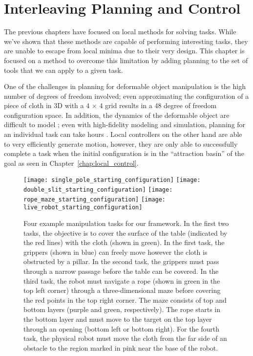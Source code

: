 \chapter{Interleaving Planning and Control}
\label{chap:interleaving}

The previous chapters have focused on local methods for solving tasks. While we've shown that these methods are capable of performing interesting tasks, they are unable to escape from local minima due to their very design. This chapter is focused on a method to overcome this limitation by adding planning to the set of tools that we can apply to a given task.

One of the challenges in planning for deformable object manipulation is the high number of degrees of freedom involved; even approximating the configuration of a piece of cloth in 3D with a 4 $\times$ 4 grid results in a 48 degree of freedom configuration space. In addition, the dynamics of the deformable object are difficult to model \citep{Essahbi2012}; even with high-fidelity modeling and simulation, planning for an individual task can take hours \citep{Bai2016}. Local controllers on the other hand are able to very efficiently generate motion, however, they are only able to successfully complete a task when the initial configuration is in the ``attraction basin'' of the goal as seen in Chapter~\ref{chap:local_control}.

\begin{figure*}[t]
    \centering
    \texttt{[image: single\_pole\_starting\_configuration]}
    \hfill
    \texttt{[image: double\_slit\_starting\_configuration]}
    \hfill
    \texttt{[image: rope\_maze\_starting\_configuration]}
    \hfill
    \texttt{[image: live\_robot\_starting\_configuration]}
    \caption{Four example manipulation tasks for our framework. In the first two tasks, the objective is to cover the surface of the table (indicated by the red lines) with the cloth (shown in green). In the first task, the grippers (shown in blue) can freely move however the cloth is obstructed by a pillar. In the second task, the grippers must pass through a narrow passage before the table can be covered. In the third task, the robot must navigate a rope (shown in green in the top left corner) through a three-dimensional maze before covering the red points in the top right corner. The maze consists of top and bottom layers (purple and green, respectively). The rope starts in the bottom layer and must move to the target on the top layer through an opening (bottom left or bottom right). For the fourth task, the physical robot must move the cloth from the far side of an obstacle to the region marked in pink near the base of the robot.}
    \label{fig:example_tasks}
\end{figure*}

